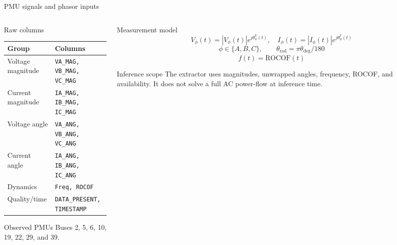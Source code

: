 ﻿\documentclass[10pt,aspectratio=169]{beamer}
\newcommand{\code}[1]{\texttt{\footnotesize #1}}
\begin{document}
\fi
\begin{frame}{PMU signals and phasor inputs}
\small
\begin{columns}[T,totalwidth=\textwidth]
\begin{column}{0.50\textwidth}
\begin{block}{Raw columns}
\scriptsize
\begin{tabular}{ll}
\toprule
Group & Columns\\
\midrule
Voltage magnitude & \code{VA\_MAG, VB\_MAG, VC\_MAG}\\
Current magnitude & \code{IA\_MAG, IB\_MAG, IC\_MAG}\\
Voltage angle & \code{VA\_ANG, VB\_ANG, VC\_ANG}\\
Current angle & \code{IA\_ANG, IB\_ANG, IC\_ANG}\\
Dynamics & \code{Freq, ROCOF}\\
Quality/time & \code{DATA\_PRESENT, TIMESTAMP}\\
\bottomrule
\end{tabular}
\end{block}
\begin{exampleblock}{Observed PMUs}
Buses 2, 5, 6, 10, 19, 22, 29, and 39.
\end{exampleblock}
\end{column}
\begin{column}{0.46\textwidth}
\begin{block}{Measurement model}
\[
V_{\phi}(t)=|V_{\phi}(t)|e^{j\theta^V_{\phi}(t)},\quad
I_{\phi}(t)=|I_{\phi}(t)|e^{j\theta^I_{\phi}(t)}
\]
\[
\phi\in\{A,B,C\},\qquad
\theta_{\mathrm{rad}}=\pi\theta_{\mathrm{deg}}/180
\]
\[
\dot f(t)=\mathrm{ROCOF}(t)
\]
\end{block}
\begin{alertblock}{Inference scope}
The extractor uses magnitudes, unwrapped angles, frequency, ROCOF, and availability. It does not solve a full AC power-flow at inference time.
\end{alertblock}
\end{column}
\end{columns}
\end{frame}
\end{document}
